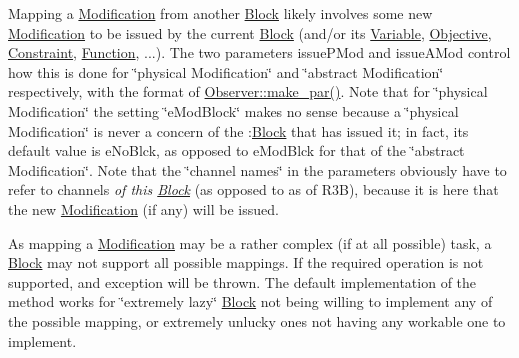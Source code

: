 Mapping a \mbox{\hyperlink{class_s_m_spp__di__unipi__it_1_1_modification}{Modification}} from another \mbox{\hyperlink{class_s_m_spp__di__unipi__it_1_1_block}{Block}} likely involves some new \mbox{\hyperlink{class_s_m_spp__di__unipi__it_1_1_modification}{Modification}} to be issued by the current \mbox{\hyperlink{class_s_m_spp__di__unipi__it_1_1_block}{Block}} (and/or its \mbox{\hyperlink{class_s_m_spp__di__unipi__it_1_1_variable}{Variable}}, \mbox{\hyperlink{class_s_m_spp__di__unipi__it_1_1_objective}{Objective}}, \mbox{\hyperlink{class_s_m_spp__di__unipi__it_1_1_constraint}{Constraint}}, \mbox{\hyperlink{class_s_m_spp__di__unipi__it_1_1_function}{Function}}, ...). The two parameters issue\+P\+Mod and issue\+A\+Mod control how this is done for \char`\"{}physical Modification\char`\"{} and \char`\"{}abstract Modification\char`\"{} respectively, with the format of \mbox{\hyperlink{class_s_m_spp__di__unipi__it_1_1_observer_a2d499ae38e5e95cf66cd71da32b0694a}{Observer\+::make\+\_\+par()}}. Note that for \char`\"{}physical Modification\char`\"{} the setting \char`\"{}e\+Mod\+Block\char`\"{} makes no sense because a \char`\"{}physical Modification\char`\"{} is never a concern of the \+:\mbox{\hyperlink{class_s_m_spp__di__unipi__it_1_1_block}{Block}} that has issued it; in fact, its default value is e\+No\+Blck, as opposed to e\+Mod\+Blck for that of the \char`\"{}abstract Modification\char`\"{}. Note that the \char`\"{}channel names\char`\"{} in the parameters obviously have to refer to channels {\itshape of this \mbox{\hyperlink{class_s_m_spp__di__unipi__it_1_1_block}{Block}}} (as opposed to as of R3B), because it is here that the new \mbox{\hyperlink{class_s_m_spp__di__unipi__it_1_1_modification}{Modification}} (if any) will be issued.

As mapping a \mbox{\hyperlink{class_s_m_spp__di__unipi__it_1_1_modification}{Modification}} may be a rather complex (if at all possible) task, a \mbox{\hyperlink{class_s_m_spp__di__unipi__it_1_1_block}{Block}} may not support all possible mappings. If the required operation is not supported, and exception will be thrown. The default implementation of the method works for \char`\"{}extremely lazy\char`\"{} \mbox{\hyperlink{class_s_m_spp__di__unipi__it_1_1_block}{Block}} not being willing to implement any of the possible mapping, or extremely unlucky ones not having any workable one to implement. \mbox{\label{class_s_m_spp__di__unipi__it_1_1_block_a04f0a8a608fcc3ded227c2552f67f1a3}} 
